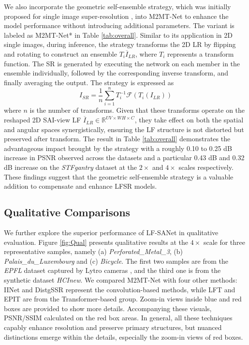 We also incorporate the geometric self-ensemble strategy, which was initially proposed for single image super-resolution \cite{limEDSR_CVPRW2017}, into M2MT-Net to enhance the model performance without introducing additional parameters. The variant is labeled as M2MT-Net* in Table \ref{tab:overall}. Similar to its application in 2D single images, during inference, the strategy transforms the 2D LR by flipping and rotating to construct an ensemble ${T_{i}\overline{I}_{LR}}$, where $T_{i}$ represents a transform function. The SR is generated by executing the network on each member in the ensemble individually, followed by the corresponding inverse transform, and finally averaging the output. The strategy is expressed as
\begin{equation}
    I_{SR} = \frac{1}{n} \sum_{i = 1}^{n} T_{i}^{-1}\mathcal{F}(T_{i}(I_{LR}))
\end{equation}
where $n$ is the number of transforms. Given that these transforms operate on the reshaped 2D SAI-view LF $\overline{I}_{LR} \in \mathbb{R}^{U V \times WH \times C}$, they take effect on both the spatial and angular spaces synergistically, ensuring the LF structure is not distorted but preserved after transform. The result in Table \ref{tab:overall} demonstrates the advantageous impact brought by the strategy with a roughly 0.10 to 0.25 dB increase in PSNR observed across the datasets and a particular 0.43 dB and 0.32 dB increase on the \textit{STFgantry} dataset at the $2 \times$ and $4 \times$ scales respectively. These findings suggest that the geometric self-ensemble strategy is a valuable addition to compensate and enhance LFSR models.


\subsection{Qualitative Comparisons}
We further explore the superior performance of LF-SANet in qualitative evaluation. Figure \ref{fig:Qual} presents qualitative results at the $4 \times$ scale for three representative samples, namely (a) \textit{Perforated\_Metal\_3}, (b) \textit{Palais\_du\_Luxembourg} and (c) \textit{Bicycle}. The first two samples are from the \textit{EPFL} dataset captured by Lytro cameras \cite{Lytro}, and the third one is from the synthetic dataset \textit{HCInew}. We compared M2MT-Net with four other methods: IINet and DistgSSR represent the convolution-based methods, while LFT and EPIT are from the Transformer-based group. Zoom-in views inside blue and red boxes are provided to show more details. Accompanying these visuals, PSNR/SSIM calculated on the red box areas. In general, all these techniques capably enhance resolution and preserve primary structures, but nuanced distinctions emerge within the details, especially the zoom-in views of red boxes.

